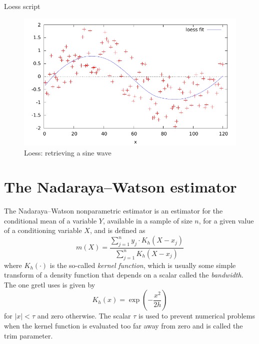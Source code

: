 \begin{script}[htbp]
  \caption{Loess script}
  \label{scr:loess-sine}
\end{script}

\begin{figure}[htbp]
  \centering
  \includegraphics[scale=0.75]{figures/loess-sine}
  \caption{Loess: retrieving a sine wave}
  \label{fig:loess-sine}
\end{figure}

\section{The Nadaraya--Watson estimator}
\label{sec:nadarwat}

The Nadaraya--Watson nonparametric estimator \citep{nadaraya64,
  watson64} is an estimator for the conditional mean of a variable
$Y$, available in a sample of size $n$, for a given value of a
conditioning variable $X$, and is defined as
\[
  m(X) = \frac{ \sum_{j=1}^{n} y_j \cdot K_h(X - x_j)} {\sum_{j=1}^{n} K_h(X - x_j)}
\]
where $K_h(\cdot)$ is the so-called \emph{kernel function}, which is
usually some simple transform of a density function that depends on a
scalar called the \emph{bandwidth}. The one gretl uses is given
by
\[
  K_h(x) = \exp\left(-\frac{x^2}{2h}\right)
\]
for $|x| < \tau$ and zero otherwise. The scalar $\tau$ is used to
prevent numerical problems when the kernel function is evaluated too
far away from zero and is called the trim parameter.

